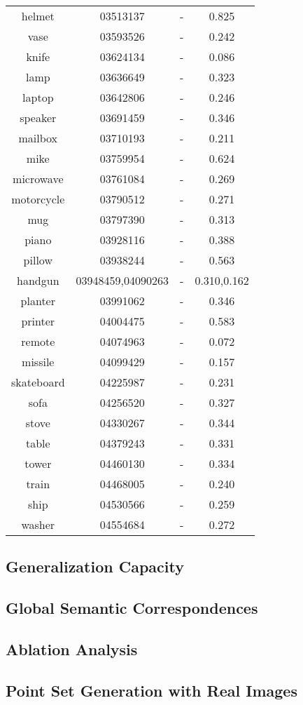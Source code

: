 \begin{table*}
\begin{tabular}{c c c c}
		helmet & 03513137 & - & 0.825\\
		vase & 03593526 & -& 0.242\\
		knife & 03624134 & - & 0.086\\
		lamp & 03636649 & - & 0.323\\
		laptop & 03642806 & - & 0.246\\
		speaker & 03691459 & - & 0.346\\
		mailbox & 03710193 & - & 0.211\\
		mike & 03759954 & - & 0.624\\
		microwave & 03761084 & - & 0.269\\
		motorcycle & 03790512 & - & 0.271\\
		mug & 03797390 & - & 0.313\\
		piano & 03928116 & -  & 0.388\\
		pillow & 03938244 & - & 0.563\\
		handgun & 03948459,04090263 & - & 0.310,0.162\\
		planter & 03991062 & - & 0.346\\
		printer & 04004475 & - & 0.583\\
		remote & 04074963 & - & 0.072\\
		missile & 04099429 & - & 0.157\\
		skateboard & 04225987 & - & 0.231\\
		sofa & 04256520 & - & 0.327\\
		stove & 04330267 & - & 0.344\\
		table & 04379243 & - & 0.331\\
		tower & 04460130 & - & 0.334\\
		train & 04468005 & - & 0.240\\
		ship  & 04530566 & - & 0.259\\
		washer &  04554684 & - & 0.272\\
	\end{tabular}
	\label{tab:seg}
\end{table*}

\subsection{Generalization Capacity}
\subsection{Global Semantic Correspondences}
\subsection{Ablation Analysis}
\subsection{Point Set Generation with Real Images}